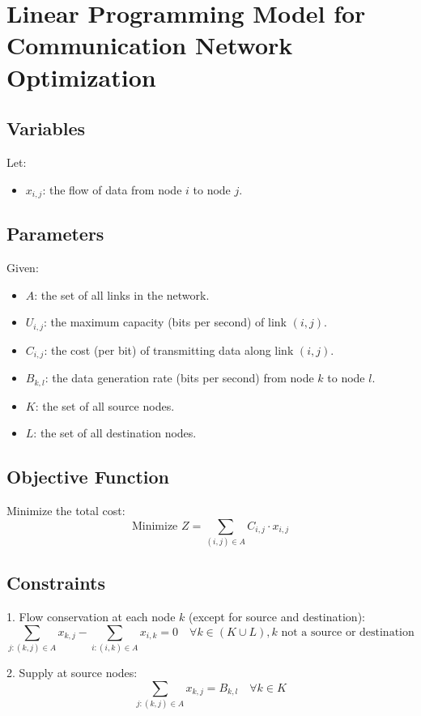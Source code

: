 \documentclass{article}
\begin{document}
\section*{Linear Programming Model for Communication Network Optimization}

\subsection*{Variables}
Let:
\begin{itemize}
    \item \( x_{i,j} \): the flow of data from node \( i \) to node \( j \).
\end{itemize}

\subsection*{Parameters}
Given:
\begin{itemize}
    \item \( A \): the set of all links in the network.
    \item \( U_{i,j} \): the maximum capacity (bits per second) of link \( (i,j) \).
    \item \( C_{i,j} \): the cost (per bit) of transmitting data along link \( (i,j) \).
    \item \( B_{k,l} \): the data generation rate (bits per second) from node \( k \) to node \( l \).
    \item \( K \): the set of all source nodes.
    \item \( L \): the set of all destination nodes.
\end{itemize}

\subsection*{Objective Function}
Minimize the total cost:
\[
\text{Minimize } Z = \sum_{(i,j) \in A} C_{i,j} \cdot x_{i,j}
\]

\subsection*{Constraints}
1. Flow conservation at each node \( k \) (except for source and destination):
\[
\sum_{j: (k,j) \in A} x_{k,j} - \sum_{i: (i,k) \in A} x_{i,k} = 0 \quad \forall k \in (K \cup L), k \text{ not a source or destination}
\]

2. Supply at source nodes:
\[
\sum_{j: (k,j) \in A} x_{k,j} = B_{k,l} \quad \forall k \in K
\]
\end{document}
